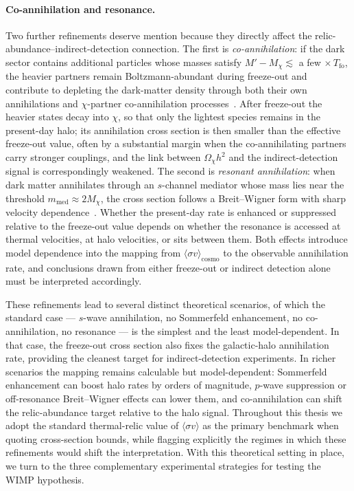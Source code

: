 \paragraph{Co-annihilation and resonance.}
Two further refinements deserve mention because they directly affect the relic-abundance--indirect-detection connection.
The first is \emph{co-annihilation}: if the dark sector contains additional particles whose masses satisfy $M' - M_\chi \lesssim$ a few$\,\times T_\mathrm{fo}$, the heavier partners remain Boltzmann-abundant during freeze-out and contribute to depleting the dark-matter density through both their own annihilations and $\chi$-partner co-annihilation processes~\cite{Ellis:1983ew,Griest:1990kh}.
After freeze-out the heavier states decay into $\chi$, so that only the lightest species remains in the present-day halo; its annihilation cross section is then smaller than the effective freeze-out value, often by a substantial margin when the co-annihilating partners carry stronger couplings, and the link between $\Omega_\chi h^2$ and the indirect-detection signal is correspondingly weakened.
The second is \emph{resonant annihilation}: when dark matter annihilates through an $s$-channel mediator whose mass lies near the threshold $m_\mathrm{med}\approx 2 M_\chi$, the cross section follows a Breit--Wigner form with sharp velocity dependence~\cite{Griest:1990kh,Gondolo:1990dk}.
Whether the present-day rate is enhanced or suppressed relative to the freeze-out value depends on whether the resonance is accessed at thermal velocities, at halo velocities, or sits between them.
Both effects introduce model dependence into the mapping from $\langle\sigma v\rangle_\mathrm{cosmo}$ to the observable annihilation rate, and conclusions drawn from either freeze-out or indirect detection alone must be interpreted accordingly.

These refinements lead to several distinct theoretical scenarios, of which the standard case --- $s$-wave annihilation, no Sommerfeld enhancement, no co-annihilation, no resonance --- is the simplest and the least model-dependent.
In that case, the freeze-out cross section also fixes the galactic-halo annihilation rate, providing the cleanest target for indirect-detection experiments.
In richer scenarios the mapping remains calculable but model-dependent: Sommerfeld enhancement can boost halo rates by orders of magnitude, $p$-wave suppression or off-resonance Breit--Wigner effects can lower them, and co-annihilation can shift the relic-abundance target relative to the halo signal.
Throughout this thesis we adopt the standard thermal-relic value of $\langle\sigma v\rangle$ as the primary benchmark when quoting cross-section bounds, while flagging explicitly the regimes in which these refinements would shift the interpretation.
With this theoretical setting in place, we turn to the three complementary experimental strategies for testing the WIMP hypothesis.
